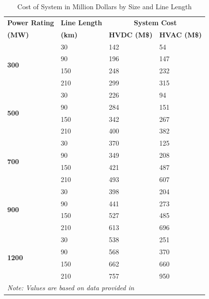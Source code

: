 \documentclass{ieeeaccess}
\begin{document}
\begin{table}[htbp]
\caption{Cost of System in Million Dollars by Size and Line Length} \label{System cost}
\renewcommand{\arrayrulewidth}{1.1pt} %
\renewcommand{\arraystretch}{1.2} %
\small
\centering
\begin{tabular}{|
p{1.5cm}<{\centering}|
p{1.6cm}<{\centering}|
p{1.7cm}<{\centering}|
p{1.6cm}<{\centering}|}
\hline
\textbf{Power Rating} & \textbf{Line Length} & \multicolumn{2}{c|}{\textbf{System Cost}} \\
\hhline{|>{\arrayrulecolor{white}}-|
         |>{\arrayrulecolor{white}}-
         |>{\arrayrulecolor{black}}--|}
\textbf{(MW)} & \textbf{(km)} & {\bfseries HVDC (M\$)} & {\bfseries HVAC (M\$)} \\
\hline

\multirow{4}{*}{\textbf{300}}  & 30  & 142  & 54  \\
                                & 90  & 196  & 147 \\
                                & 150 & 248  & 232 \\
                                & 210 & 299  & 315 \\
\hline

\multirow{4}{*}{\textbf{500}}  & 30  & 226  & 94  \\
                                & 90  & 284  & 151 \\
                                & 150 & 342  & 267 \\
                                & 210 & 400  & 382 \\
\hline

\multirow{4}{*}{\textbf{700}}  & 30  & 370  & 125 \\
                                & 90  & 349  & 208 \\
                                & 150 & 421  & 487 \\
                                & 210 & 493  & 607 \\
\hline

\multirow{4}{*}{\textbf{900}}  & 30  & 398  & 204 \\
                                & 90  & 441  & 273 \\
                                & 150 & 527  & 485 \\
                                & 210 & 613  & 696 \\
\hline

\multirow{4}{*}{\textbf{1200}} & 30  & 538  & 251 \\
                                & 90  & 568  & 370 \\
                                & 150 & 662  & 660 \\
                                & 210 & 757  & 950 \\
\hline

\multicolumn{4}{l}{\textit{Note: Values are based on data provided in \cite{meng2021comparative}}} \\
\hline
\end{tabular}
\end{table}
\end{document}
